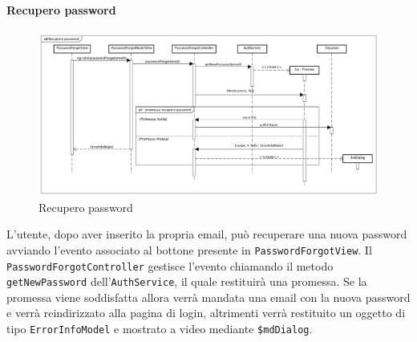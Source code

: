 \paragraph{Recupero password}

\label{Recupero password}

\begin{figure}[ht]
	\centering
	\includegraphics[scale=0.35,keepaspectratio]{UML/DiagrammiDiSequenza/Front-end/PasswordForgot.png}
	\caption{Recupero password}
\end{figure} \FloatBarrier

L'utente, dopo aver inserito la propria email, può recuperare una nuova password avviando l'evento associato al bottone presente in \texttt{PasswordForgotView}. Il \texttt{PasswordForgotController} gestisce l'evento chiamando il metodo \texttt{getNewPassword} dell'\texttt{AuthService}, il quale restituirà una promessa. Se la promessa viene soddisfatta allora verrà mandata una email con la nuova password e verrà reindirizzato alla pagina di login, altrimenti verrà restituito un oggetto di tipo \texttt{ErrorInfoModel} e mostrato a video mediante \texttt{\$mdDialog}. 
